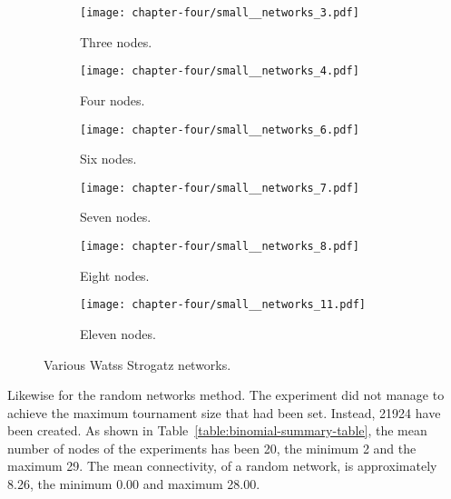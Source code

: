 \begin{figure}[!hbtp]
	\centering
	\begin{subfigure}[t]{0.30\textwidth}
		\centering
		\texttt{[image: chapter-four/small\_\_networks\_3.pdf]}
		\caption{Three nodes.}
	\end{subfigure}
	\hfill
	\begin{subfigure}[t]{0.30\textwidth}\centering
		\centering
		\texttt{[image: chapter-four/small\_\_networks\_4.pdf]}
		\caption{Four nodes.}
	\end{subfigure}
	\hfill
	\begin{subfigure}[t]{0.30\textwidth}\centering
		\centering
		\texttt{[image: chapter-four/small\_\_networks\_6.pdf]}
		\caption{Six nodes.}
	\end{subfigure}
	\hfill
	\begin{subfigure}[t]{0.30\textwidth}\centering
		\centering
		\texttt{[image: chapter-four/small\_\_networks\_7.pdf]}
		\caption{Seven nodes.}
	\end{subfigure}
	\hfill
	\begin{subfigure}[t]{0.30\textwidth}\centering
		\centering
		\texttt{[image: chapter-four/small\_\_networks\_8.pdf]}
		\caption{Eight nodes.}
	\end{subfigure}
	\hfill
	\begin{subfigure}[t]{0.30\textwidth}\centering
		\centering
		\texttt{[image: chapter-four/small\_\_networks\_11.pdf]}
		\caption{Eleven nodes.}
	\end{subfigure}
	\caption{Various Watss Strogatz networks.}
	\label{fig:small_networks_illustration}
\end{figure}

Likewise for the random networks method. The experiment did not manage to
achieve the maximum tournament size that had been set. Instead, 21924 have been
created. As shown in Table~\ref{table:binomial-summary-table}, the mean number
of nodes of the experiments has been 20, the minimum 2 and the maximum 29. The
mean connectivity, of a random network, is approximately 8.26, the minimum
0.00 and maximum 28.00.

